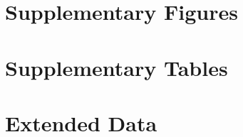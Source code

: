 \documentclass{article}
\begin{document}
\section{Supplementary Figures}
\label{sec:supplementary_figures}

\clearpage

\section{Supplementary Tables}
\label{sec:supplementary_tables}

\clearpage

\section{Extended Data}
\label{sec:extended_data}

\clearpage

\printbibliography
\end{document}
